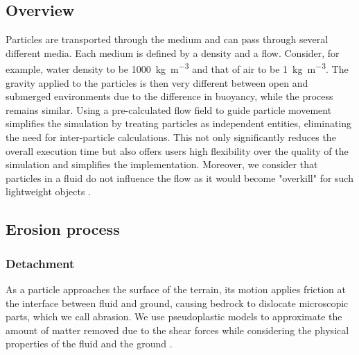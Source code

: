 \subsection{Overview}
Particles are transported through the medium and can pass through several different media. Each medium is defined by a density and a flow. Consider, for example, water density to be \SI{1000}{\kilogram \per \cubic \meter} and that of air to be \SI{1}{\kilogram \per \cubic \meter}. The gravity applied to the particles is then very different between open and submerged environments due to the difference in buoyancy, while the process remains similar.
Using a pre-calculated flow field to guide particle movement simplifies the simulation by treating particles as independent entities, eliminating the need for inter-particle calculations. This not only significantly reduces the overall execution time but also offers users high flexibility over the quality of the simulation and simplifies the implementation. Moreover, we consider that particles in a fluid do not influence the flow as it would become "overkill" for such lightweight objects \cite{Wei2003}.

\subsection{Erosion process}


\subsubsection{Detachment}
As a particle approaches the surface of the terrain, its motion applies friction at the interface between fluid and ground, causing bedrock to dislocate microscopic parts, which we call abrasion. We use pseudoplastic models to approximate the amount of matter removed due to the shear forces while considering the physical properties of the fluid and the ground \cite{Wojtan2007}. 

